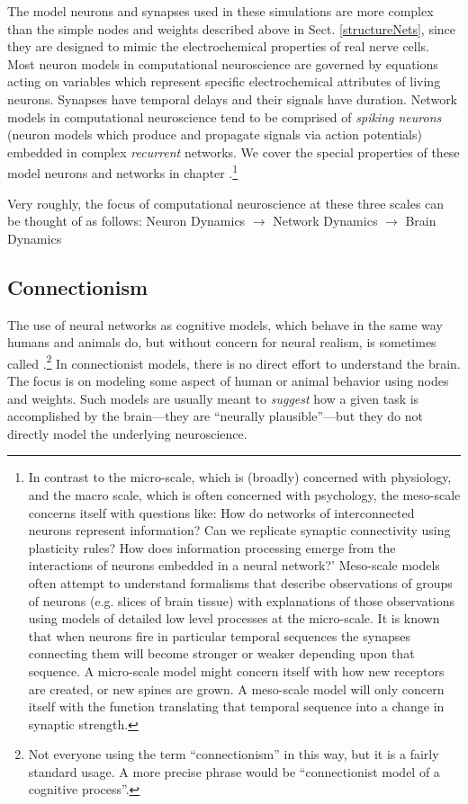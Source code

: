 The model neurons and synapses used in these simulations  are  more complex than the simple nodes and weights described above in Sect. \ref{structureNets},  since they are designed to mimic the electrochemical properties of real nerve cells. Most neuron models in computational neuroscience are governed by equations acting on variables which represent specific electrochemical attributes of living neurons. Synapses have temporal delays and their signals have duration. Network models in computational neuroscience tend to be comprised of \emph{spiking neurons} (neuron models which produce and propagate signals via action potentials) embedded in complex \emph{recurrent} networks. We cover the special properties of these model neurons and networks in chapter .\footnote{In contrast to the micro-scale, which is (broadly) concerned with physiology, and the macro scale, which is often concerned with psychology, the meso-scale concerns itself with questions like: How do networks of interconnected neurons represent information? Can we replicate synaptic connectivity using plasticity rules? How does information processing emerge from the interactions of neurons embedded in a neural network?'  Meso-scale models often attempt to understand formalisms that describe observations of groups of neurons (e.g. slices of brain tissue) with explanations of those observations using models of detailed low level processes at the micro-scale. It is known that when neurons fire in particular temporal sequences the synapses connecting them will become stronger or weaker depending upon that sequence. A micro-scale model might concern itself with how new receptors are created, or new spines are grown. A meso-scale model will only concern itself with the function translating that temporal sequence into a change in synaptic strength.} 

Very roughly, the focus of computational neuroscience at these  three scales can be thought of as follows:
Neuron Dynamics $\rightarrow$ Network Dynamics $\rightarrow$ Brain Dynamics

\subsection{Connectionism}\label{connectionism}

The use of neural networks as cognitive models, which behave in the same way humans and animals do, but without concern for neural realism, is sometimes called .\footnote{Not everyone using the term ``connectionism'' in this way, but it is a fairly standard usage. A more precise phrase would be ``connectionist model of a cognitive process''.}  In connectionist models, there is no direct effort to understand the brain. The focus is on modeling some aspect of human or animal behavior using nodes and weights. Such models  are usually meant to {\em suggest} how a given task is accomplished by the brain---they are ``neurally plausible''---but they do not directly model the underlying neuroscience.

